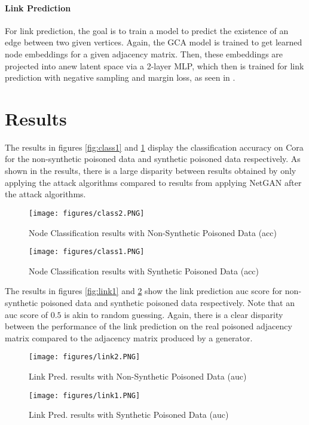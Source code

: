 \documentclass{article}
\begin{document}
\paragraph{Link Prediction}
For link prediction, the goal is to train a model to predict the existence of an edge between two given vertices. Again, the GCA model is trained to get learned node embeddings for a given adjacency matrix. Then, these embeddings are projected into anew latent space via a 2-layer MLP, which then is trained for link prediction with negative sampling and margin loss, as seen in \cite{Zhang_2022}.

\section{Results}
\label{Results}

The results in figures \ref{fig:class1} and \ref{fig:class2} display the classification accuracy on Cora for the non-synthetic poisoned data and synthetic poisoned data respectively. As shown in the results, there is a large disparity between results obtained by only applying the attack algorithms compared to results from applying NetGAN after the attack algorithms. 

\begin{figure}[H]
    \centering
    \begin{minipage}{0.45\textwidth}
        \centering
        \texttt{[image: figures/class2.PNG]}
        \caption{Node Classification results with Non-Synthetic Poisoned Data (acc)}
        \label{fig:class1}
    \end{minipage}\hfill
    \begin{minipage}{0.45\textwidth}
        \centering
        \texttt{[image: figures/class1.PNG]}
        \caption{Node Classification results with Synthetic Poisoned Data (acc)}
        \label{fig:class2}
    \end{minipage}
\end{figure}

The results in figures \ref{fig:link1} and \ref{fig:link2} show the link prediction auc score for non-synthetic poisoned data and synthetic poisoned data respectively. Note that an auc score of $0.5$ is akin to random guessing. Again, there is a clear disparity between the performance of the link prediction on the real poisoned adjacency matrix compared to the adjacency matrix produced by a generator. 

\begin{figure}[H]
    \centering
    \begin{minipage}{0.45\textwidth}
        \centering
        \texttt{[image: figures/link2.PNG]} 
        \caption{Link Pred. results with Non-Synthetic Poisoned Data (auc)}
        \label{fig:link1}
    \end{minipage}\hfill
    \begin{minipage}{0.45\textwidth}
        \centering
        \texttt{[image: figures/link1.PNG]} 
        \caption{Link Pred. results with Synthetic Poisoned Data (auc)}
        \label{fig:link2}
    \end{minipage}
\end{figure}
\end{document}
